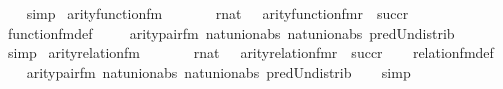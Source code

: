 \begin{isabellebody}
\ \ \isamarkupfalse%
\ simp%
\endisatagproof
{\isafoldproof}%
%
\isadelimproof
\isanewline
%
\endisadelimproof
\isanewline
\isanewline
{}\isamarkupfalse%
\ arity{\isacharunderscore}{\kern0pt}function{\isacharunderscore}{\kern0pt}fm\ {\isacharcolon}{\kern0pt}\ \isanewline
\ \ \ \ {\isachardoublequoteopen}{\isasymlbrakk}\ r{\isasymin}nat\ {\isasymrbrakk}\ {\isasymLongrightarrow}\ arity{\isacharparenleft}{\kern0pt}function{\isacharunderscore}{\kern0pt}fm{\isacharparenleft}{\kern0pt}r{\isacharparenright}{\kern0pt}{\isacharparenright}{\kern0pt}\ {\isacharequal}{\kern0pt}\ succ{\isacharparenleft}{\kern0pt}r{\isacharparenright}{\kern0pt}{\isachardoublequoteclose}\isanewline
%
\isadelimproof
\ \ %
\endisadelimproof
%
\isatagproof
{}\isamarkupfalse%
\ function{\isacharunderscore}{\kern0pt}fm{\isacharunderscore}{\kern0pt}def\ \isanewline
\ \ \isamarkupfalse%
\ arity{\isacharunderscore}{\kern0pt}pair{\isacharunderscore}{\kern0pt}fm\ nat{\isacharunderscore}{\kern0pt}union{\isacharunderscore}{\kern0pt}abs{}\ nat{\isacharunderscore}{\kern0pt}union{\isacharunderscore}{\kern0pt}abs{}\ pred{\isacharunderscore}{\kern0pt}Un{\isacharunderscore}{\kern0pt}distrib\isanewline
\ \ \isamarkupfalse%
\ simp%
\endisatagproof
{\isafoldproof}%
%
\isadelimproof
\isanewline
%
\endisadelimproof
\isanewline
{}\isamarkupfalse%
\ arity{\isacharunderscore}{\kern0pt}relation{\isacharunderscore}{\kern0pt}fm\ {\isacharcolon}{\kern0pt}\ \isanewline
\ \ \ \ {\isachardoublequoteopen}{\isasymlbrakk}\ r{\isasymin}nat\ {\isasymrbrakk}\ {\isasymLongrightarrow}\ arity{\isacharparenleft}{\kern0pt}relation{\isacharunderscore}{\kern0pt}fm{\isacharparenleft}{\kern0pt}r{\isacharparenright}{\kern0pt}{\isacharparenright}{\kern0pt}\ {\isacharequal}{\kern0pt}\ succ{\isacharparenleft}{\kern0pt}r{\isacharparenright}{\kern0pt}{\isachardoublequoteclose}\isanewline
%
\isadelimproof
\ \ %
\endisadelimproof
%
\isatagproof
{}\isamarkupfalse%
\ relation{\isacharunderscore}{\kern0pt}fm{\isacharunderscore}{\kern0pt}def\ \isanewline
\ \ \isamarkupfalse%
\ arity{\isacharunderscore}{\kern0pt}pair{\isacharunderscore}{\kern0pt}fm\ nat{\isacharunderscore}{\kern0pt}union{\isacharunderscore}{\kern0pt}abs{}\ nat{\isacharunderscore}{\kern0pt}union{\isacharunderscore}{\kern0pt}abs{}\ pred{\isacharunderscore}{\kern0pt}Un{\isacharunderscore}{\kern0pt}distrib\isanewline
\ \ \isamarkupfalse%
\ simp%
\endisatagproof
{\isafoldproof}%
%
\isadelimproof

\end{isabellebody}
